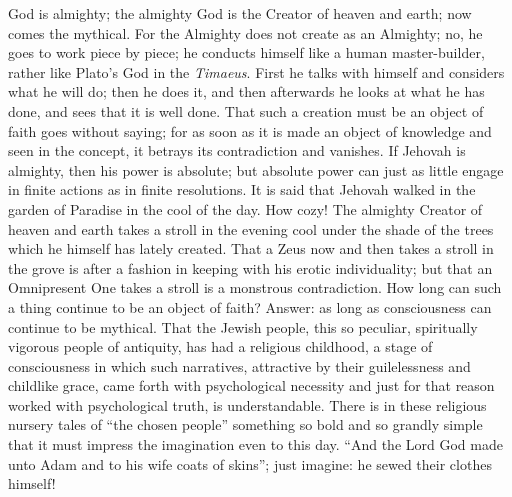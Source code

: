 \documentclass[12pt]{book}
\newcommand{\opage}[1]{\marginnote{\footnotesize\textit{[#1]}}}
\begin{document}
God is almighty; the almighty God is the Creator of heaven and earth;
now comes the mythical. For the Almighty does not create as an Almighty;
no, he goes to work piece by piece; he conducts himself like a human
master-builder, rather like Plato's God in the \emph{Timaeus}. First he
talks with himself and considers what he will do; then he does it, and
then afterwards he looks at what he has done, and sees that it is well
done. That such a creation must be an object of faith
\opage{98}\setcounter{footnote}{0}%
goes without saying; for as soon as it is made an object of knowledge
and seen in the concept, it betrays its contradiction and vanishes. If
Jehovah is almighty, then his power is absolute; but absolute power can
just as little engage in finite actions as in finite resolutions. It is
said that Jehovah walked in the garden of Paradise in the cool of the
day. How cozy! The almighty Creator of heaven and earth takes a stroll
in the evening cool under the shade of the trees which he himself has
lately created. That a Zeus now and then takes a stroll in the grove is
after a fashion in keeping with his erotic individuality; but that an
Omnipresent One takes a stroll is a monstrous contradiction. How long
can such a thing continue to be an object of faith? Answer: as long as
consciousness can continue to be mythical. That the Jewish people, this
so peculiar, spiritually vigorous people of antiquity, has had a
religious childhood, a stage of consciousness in which such narratives,
attractive by their guilelessness and childlike grace, came forth with
psychological necessity and just for that reason worked with
psychological truth, is understandable. There is in these religious
nursery tales of ``the chosen people'' something so bold and so
grandly simple that it must impress the imagination even to this day.
``And the Lord God made unto Adam and to his wife coats of skins'';
just imagine: he sewed their clothes himself!
\end{document}
